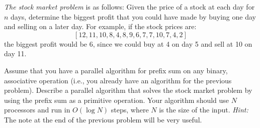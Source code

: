 {\em The stock market problem} is as follows:  Given the price of a stock at
each  day for $n$ days, determine the biggest profit that you 
could have made by buying
one day and selling on a later day.  For example, if the stock prices are:
$$[12,11,10,8,4,8,9,6,7,7,10,7,4,2]$$
the biggest profit would be 6, 
since we could buy at 4 on day 5 and sell at 10 on day 11.

Assume that you have a parallel algorithm for prefix sum on any
binary, associative operation (i.e., you already have an algorithm
for the previous problem).
Describe a parallel algorithm that 
solves the stock market problem by using the prefix sum as a primitive 
operation. Your algorithm should use $N$ processors and
run in $O(\log{N})$ steps, where $N$ is the size of the input.
{\em Hint:} The note at the end of the previous problem will be very useful.






